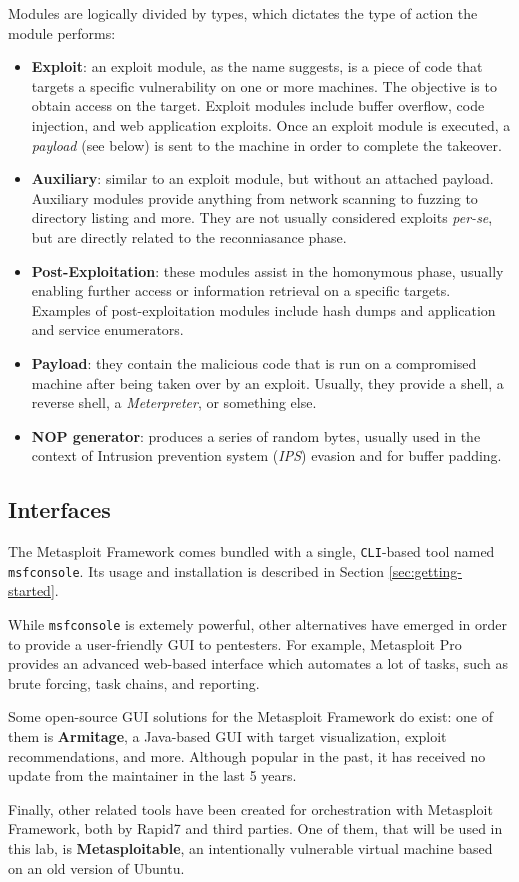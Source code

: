 Modules are logically divided by types, which dictates the type of action the module performs:

\begin{itemize}
    \item \textbf{Exploit}: an exploit module, as the name suggests, is a piece of code that targets a specific vulnerability on one or more machines. The objective is to obtain access on the target. Exploit modules include buffer overflow, code injection, and web application exploits. Once an exploit module is executed, a \textit{payload} (see below) is sent to the machine in order to complete the takeover.
    \item \textbf{Auxiliary}: similar to an exploit module, but without an attached payload. Auxiliary modules provide anything from network scanning to fuzzing to directory listing and more. They are not usually considered exploits \textit{per-se}, but are directly related to the reconniasance phase.
    \item \textbf{Post-Exploitation}: these modules assist in the homonymous phase, usually enabling further access or information retrieval on a specific targets. Examples of post-exploitation modules include hash dumps and application and service enumerators.
    \item \textbf{Payload}: they contain the malicious code that is run on a compromised machine after being taken over by an exploit. Usually, they provide a shell, a reverse shell, a \textit{Meterpreter}, or something else.
    \item \textbf{NOP generator}: produces a series of random bytes, usually used in the context of Intrusion prevention system (\textit{IPS}) evasion and for buffer padding.
\end{itemize}

\subsection{Interfaces}

The Metasploit Framework comes bundled with a single, \texttt{CLI}-based tool named \texttt{msfconsole}. Its usage and installation is described in Section \ref{sec:getting-started}. 

While \texttt{msfconsole} is extemely powerful, other alternatives have emerged in order to provide a user-friendly GUI to pentesters. For example, Metasploit Pro provides an advanced web-based interface which automates a lot of tasks, such as brute forcing, task chains, and reporting. 

Some open-source GUI solutions for the Metasploit Framework do exist: one of them is \textbf{Armitage}, a Java-based GUI with target visualization, exploit recommendations, and more. Although popular in the past, it has received no update from the maintainer in the last 5 years.

Finally, other related tools have been created for orchestration with Metasploit Framework, both by Rapid7 and third parties. One of them, that will be used in this lab, is \textbf{Metasploitable}, an intentionally vulnerable virtual machine based on an old version of Ubuntu.

\clearpage